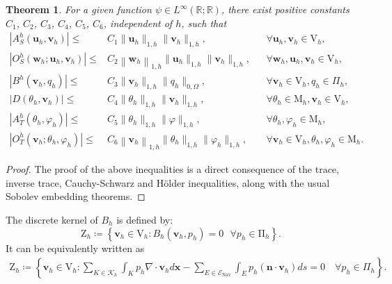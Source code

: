 \documentclass[10pt,a4paper]{article}
\newtheorem{theorem} {\bf Theorem}
\begin{document}
\newpage
  		\begin{theorem}\label{qa4}
  For a given function $\psi  \in L^{\infty}(\mathbb{R};\mathbb{R})$, there exist positive constants $C_1$, $C_2$, $C_3$, $C_4$, $C_5$, $C_6$, independent of $h$, such that
  		\begin{equation*}
  		\begin{aligned}
  		\left|{A}_S^h(\boldsymbol{u}_h, \boldsymbol{v}_h)\right| \leq& C_1 \|\boldsymbol{u}_h\|_{1, h}\|\boldsymbol{v}_h\|_{1,h}, &&  \forall \boldsymbol{u}_h, \boldsymbol{v}_h \in \mathrm{V}_h,
  		\\
  		\left|O_S^h\left(\boldsymbol{w}_h; \boldsymbol{u}_h, \boldsymbol{v}_h\right)\right| \leq& {C}_2 \left\|\boldsymbol{w}_h\right\|_{1,h}\|\boldsymbol{u}_h\|_{1,h}\|\boldsymbol{v}_h\|_{1, h}, && \forall \boldsymbol{w}_h, \boldsymbol{u}_h, \boldsymbol{v}_h \in \mathrm{V}_h,
  		\\
  		\left|{B}^h(\boldsymbol{v}_h, q_h)\right| \leq& C_3 \|\boldsymbol{v}_h\|_{1, h}\|q_h\|_{0, \Omega}, && \forall \boldsymbol{v}_h \in \mathrm{V}_h, q_h \in \Pi_h, \\ 
        \left| D( \theta_h, \boldsymbol{v}_h) \right|  \leq & C_4 \|\theta_h\|_{1,h}\|\boldsymbol{v}_h\|_{1,h} ,  && \forall \theta_h \in \mathrm{M}_h, \boldsymbol{v}_h \in \mathrm{V}_h, \\
        \left| A_T^h( \theta_h, \varphi_h)\right| \leq & C_5 \| \theta_h \|_{1,h} \| \varphi \|_{1,h} , && \forall  \theta_h, \varphi_h \in \mathrm{M}_h, \\
        \left| O_T^h(\boldsymbol{v}_h; \theta_h, \varphi_h) \right| \leq & C_6 \left\|\boldsymbol{v}_h\right\|_{1,h}\|\theta_h \|_{1,h}\|\varphi_h\|_{1,h} , && \forall \boldsymbol{v}_h \in \mathrm{V}_h, \theta_h, \varphi_h \in \mathrm{M}_h. 
  		\end{aligned}
  		\end{equation*}
        \end{theorem}  
  	\begin{proof}	
        The proof of the above inequalities is a direct consequence of the trace, inverse trace, Cauchy-Schwarz and H\"{o}lder inequalities, along with the usual Sobolev embedding theorems. 
  	\end{proof}
    \noindent The discrete kernel of ${B}_h$ is defined by:
  		$$
  		\mathrm{Z}_h \coloneqq \left\{\boldsymbol{v}_h \in \mathrm{V}_h: {B}_h\left( \boldsymbol{v}_h,p_h \right)=0 \ \ \ \forall {p}_h \in \mathrm{\Pi}_h\right\}.
  		$$
  		It can be equivalently written as
  		\begin{align}\label{a7}
  		\mathrm{Z}_h \coloneqq \left\{\boldsymbol{v}_h \in \mathrm{V}_h: \sum_{K\in \mathcal{K}_{h}} \int_{K} p_h \nabla \cdot \boldsymbol{v}_h d \boldsymbol{x} - \sum_{E\in \mathcal{E}_{\text{Nav}}} \int_{E} {p_h} (\boldsymbol{n} \cdot \boldsymbol{v}_h) ds =0 \quad \forall p_h \in \Pi_h \right\}.
  		\end{align}
\end{document}
